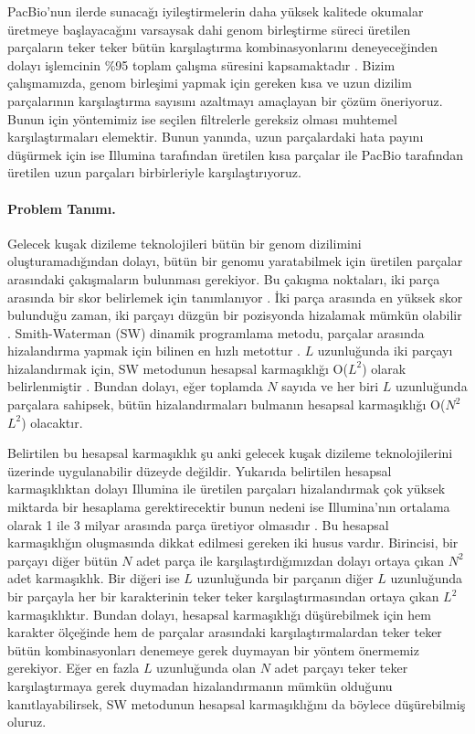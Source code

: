 

PacBio'nun ilerde sunacağı iyileştirmelerin daha yüksek kalitede okumalar üretmeye başlayacağını varsaysak dahi genom birleştirme süreci üretilen parçaların teker teker bütün karşılaştırma kombinasyonlarını deneyeceğinden dolayı işlemcinin \%95 toplam çalışma süresini kapsamaktadır \cite{Berlin2015}. Bizim çalışmamızda, genom birleşimi yapmak için gereken kısa ve uzun dizilim parçalarının karşılaştırma sayısını azaltmayı amaçlayan bir çözüm öneriyoruz. Bunun için yöntemimiz ise seçilen filtrelerle gereksiz olması muhtemel karşılaştırmaları elemektir. Bunun yanında, uzun parçalardaki hata payını düşürmek için ise Illumina tarafından üretilen kısa parçalar ile PacBio tarafından üretilen uzun parçaları birbirleriyle karşılaştırıyoruz.

\paragraph{Problem Tanımı.}

Gelecek kuşak dizileme teknolojileri bütün bir genom dizilimini oluşturamadığından dolayı, bütün bir genomu yaratabilmek için üretilen parçalar arasındaki çakışmaların bulunması gerekiyor. Bu çakışma noktaları, iki parça arasında bir skor belirlemek için tanımlanıyor \cite{Staden1980}. İki parça arasında en yüksek skor bulunduğu zaman, iki parçayı düzgün bir pozisyonda hizalamak mümkün olabilir \cite{Staden1980}. Smith-Waterman (SW) dinamik programlama metodu, parçalar arasında hizalandırma yapmak için bilinen en hızlı metottur \cite{Smith1981}. $L$ uzunluğunda iki parçayı hizalandırmak için, SW metodunun hesapsal karmaşıklığı O($L^2$) olarak belirlenmiştir \cite{Smith1981}. Bundan dolayı, eğer toplamda $N$ sayıda ve her biri $L$ uzunluğunda parçalara sahipsek, bütün hizalandırmaları bulmanın hesapsal karmaşıklığı O($N^2$$L^2$) olacaktır.

Belirtilen bu hesapsal karmaşıklık şu anki gelecek kuşak dizileme teknolojilerini üzerinde uygulanabilir düzeyde değildir. Yukarıda belirtilen hesapsal karmaşıklıktan dolayı Illumina ile üretilen parçaları hizalandırmak çok yüksek miktarda bir hesaplama gerektirecektir bunun nedeni ise Illumina'nın ortalama olarak 1 ile 3 milyar arasında parça üretiyor olmasıdır \cite{Metzker2010}. Bu hesapsal karmaşıklığın oluşmasında dikkat edilmesi gereken iki husus vardır. Birincisi, bir parçayı diğer bütün $N$ adet parça ile karşılaştırdığımızdan dolayı ortaya çıkan $N^2$ adet karmaşıklık. Bir diğeri ise $L$ uzunluğunda bir parçanın diğer $L$ uzunluğunda bir parçayla her bir karakterinin teker teker karşılaştırmasından ortaya çıkan $L^2$ karmaşıklıktır. Bundan dolayı, hesapsal karmaşıklığı düşürebilmek için hem karakter ölçeğinde hem de parçalar arasındaki karşılaştırmalardan teker teker bütün kombinasyonları denemeye gerek duymayan bir yöntem önermemiz gerekiyor. Eğer en fazla $L$ uzunluğunda olan $N$ adet parçayı teker teker karşılaştırmaya gerek duymadan hizalandırmanın mümkün olduğunu kanıtlayabilirsek, SW metodunun hesapsal karmaşıklığını da böylece düşürebilmiş oluruz.

